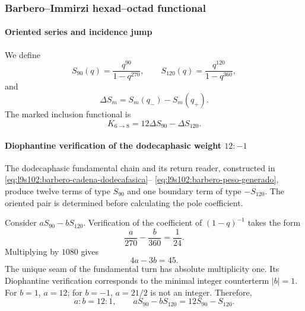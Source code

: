 \subsubsection{Barbero--Immirzi hexad--octad functional}

\paragraph{Oriented series and incidence jump}

We define
\begin{equation}
S_{90}(q)=\frac{q^{90}}{1-q^{270}},
\qquad
S_{120}(q)=\frac{q^{120}}{1-q^{360}},
\label{eq:barbero-series}
\end{equation}
and
\[
\Delta S_m=S_m(q_-)-S_m(q_+).
\]
The marked inclusion functional is
\begin{equation}
K_{6\to8}=12\Delta S_{90}-\Delta S_{120}.
\label{eq:barbero-núcleo}
\end{equation}

\paragraph{Diophantine verification of the dodecaphasic weight \(12:-1\)}

The dodecaphasic fundamental chain and its return reader, constructed in
\eqref{eq:l9s102:barbero-cadena-dodecafasica}--%
\eqref{eq:l9s102:barbero-peso-generado}, produce twelve terms of type
\(S_{90}\) and one boundary term of type \(-S_{120}\). The oriented pair
is determined before calculating the pole coefficient.

Consider \(aS_{90}-bS_{120}\). Verification of the coefficient of
\((1-q)^{-1}\) takes the form
\begin{equation}
\frac{a}{270}-\frac{b}{360}=\frac1{24}.
\label{eq:pole-condition}
\end{equation}
Multiplying by \(1080\) gives
\[
4a-3b=45.
\]
The unique seam of the fundamental turn has absolute multiplicity one.
Its Diophantine verification corresponds to the minimal integer counterterm
\(|b|=1\). For \(b=1\), \(a=12\); for \(b=-1\), \(a=21/2\) is not an integer.
Therefore,
\begin{equation}
\boxed{a:b=12:1,\qquad aS_{90}-bS_{120}=12S_{90}-S_{120}.}
\label{eq:12minus1}
\end{equation}

